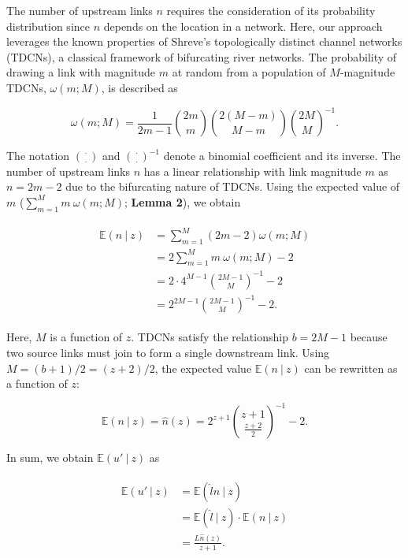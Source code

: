 \documentclass[11pt, class=article, crop=false]{standalone}
\begin{document}
The number of upstream links $n$ requires the consideration of its probability distribution since $n$ depends on the location in a network.
Here, our approach leverages the known properties of Shreve's topologically distinct channel networks (TDCNs), a classical framework of bifurcating river networks.
The probability of drawing a link with magnitude $m$ at random from a population of $M$-magnitude TDCNs, $\omega(m; M)$, is described as

\begin{equation}
    \omega(m; M) = \frac{1}{2m - 1} \binom{2m}{m} \binom{2(M - m)}{M - m} \binom{2M}{M}^{-1}.
\end{equation}

The notation $\binom{\cdot}{\cdot}$ and $\binom{\cdot}{\cdot}^{-1}$ denote a binomial coefficient and its inverse.
The number of upstream links $n$ has a linear relationship with link magnitude $m$ as $n = 2m - 2$ due to the bifurcating nature of TDCNs.
Using the expected value of $m$ ($\sum_{m=1}^{M} m~\omega(m; M)$; \textbf{Lemma 2}), we obtain

\begin{align}
    \begin{split}
    \mathbb{E}(n~|~z) 
        &= \sum_{m=1}^{M} (2m - 2) \omega(m; M)\\
        &= 2 \sum_{m=1}^{M} m~\omega(m; M) - 2\\
        &= 2 \cdot 4^{M-1} \binom{2M-1}{M}^{-1} - 2\\
        &= 2^{2M-1} \binom{2M-1}{M}^{-1} - 2.
    \end{split}
    \label{eq:n-hat}
\end{align}

Here, $M$ is a function of $z$.
TDCNs satisfy the relationship $b = 2M - 1$ because two source links must join to form a single downstream link.
Using $M = (b + 1) / 2 = (z + 2) / 2$, the expected value $\mathbb{E}(n~|~z)$ can be rewritten as a function of $z$:

\begin{equation}
    \mathbb{E}(n~|~z) = \hat{n}(z) = 
    2^{z + 1} \binom{z + 1}{\frac{z + 2}{2}}^{-1} - 2.
\end{equation}

In sum, we obtain $\mathbb{E}(u' ~|~ z)$ as

\begin{align}
    \begin{split}
        \mathbb{E}(u' ~|~ z) &= \mathbb{E}(\hat{l}n ~|~ z)\\
                           &= \mathbb{E}(\hat{l} ~|~ z) \cdot \mathbb{E}(n ~|~ z)\\
                           &= \frac{L \hat{n}(z)}{z + 1}.
    \end{split}
\end{align}
\end{document}
